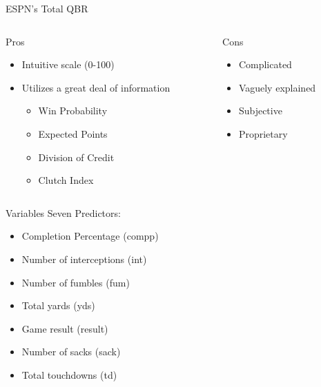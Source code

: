 \documentclass{beamer}
\begin{document}
	\begin{frame}{ESPN's Total QBR}
		\begin{columns}
			\begin{column}[t]{0.5\textwidth}
				Pros
				\begin{itemize}
					\item Intuitive scale (0-100)
					\item Utilizes a great deal of information
					\begin{itemize}
						\item Win Probability
						\item Expected Points
						\item Division of Credit
						\item Clutch Index
					\end{itemize}
				\end{itemize}
			\end{column}
			
			\begin{column}[t]{0.5\textwidth}
				Cons
				\begin{itemize}
					\item Complicated
					\item Vaguely explained
					\item Subjective
					\item Proprietary
				\end{itemize}
			\end{column}
		\end{columns}
	\end{frame}

	\begin{frame}{Variables}
	Seven Predictors:
	\begin{itemize}
		\item Completion Percentage (compp)
		\item Number of interceptions (int)
		\item Number of fumbles (fum)
		\item Total yards (yds)
		\item Game result (result)
		\item Number of sacks (sack)
		\item Total touchdowns (td)
		\end{itemize}
	\end{frame}

	
\end{document}
